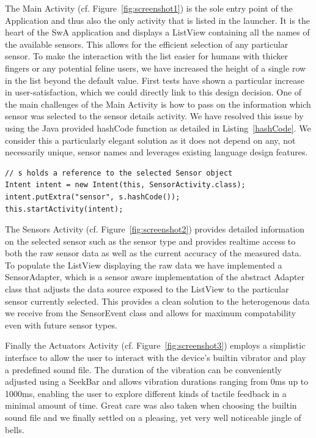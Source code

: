 \documentclass{report}
\newcommand{\rfig}[1]{Figure~\ref{fig:#1}}
\newcommand{\rlst}[1]{Listing~\ref{#1}}
\begin{document}
\par
The Main Activity (cf. \rfig{screenshot1}) is the sole entry point of the Application and thus also the only activity that is listed in the launcher. It is the heart of the SwA application and displays a ListView containing all the names of the available sensors. This allows for the efficient selection of any particular sensor. To make the interaction with the list easier for humans with thicker fingers or any potential feline users, we have increased the height of a single row in the list beyond the default value. First tests have shown a particular increase in user-satisfaction, which we could directly link to this design decision.
\indent
One of the main challenges of the Main Activity is how to pass on the information which sensor was selected to the sensor details activity. We have resolved this issue by using the Java provided hashCode function\cite{javaHashCode} as detailed in \rlst{hashCode}. We consider this a particularly elegant solution as it does not depend on any, not necessarily unique, sensor names and leverages existing language design features.

\begin{lstlisting}
// s holds a reference to the selected Sensor object
Intent intent = new Intent(this, SensorActivity.class);
intent.putExtra("sensor", s.hashCode());
this.startActivity(intent);
\end{lstlisting}

\par
\indent
The Sensors Activity (cf. \rfig{screenshot2}) provides detailed information on the selected sensor such as the sensor type and provides realtime access to both the raw sensor data as well as the current accuracy of the measured data. To populate the ListView displaying the raw data we have implemented a SensorAdapter, which is a sensor aware implementation of the abstract Adapter class that adjusts the data source exposed to the ListView to the particular sensor currently selected. This provides a clean solution to the heterogenous data we receive from the SensorEvent class\cite{androidSensorEvent} and allows for maximum compatability even with future sensor types.
\par
\indent
Finally the Actuators Activity (cf. \rfig{screenshot3}) employs a simplistic interface to allow the user to interact with the device's builtin vibrator and play a predefined sound file. The duration of the vibration can be conveniently adjusted using a SeekBar and allows vibration durations ranging from 0ms up to 1000ms, enabling the user to explore different kinds of tactile feedback in a minimal amount of time. Great care was also taken when choosing the builtin sound file and we finally settled on a pleasing, yet very well noticeable jingle of bells.
\end{document}
